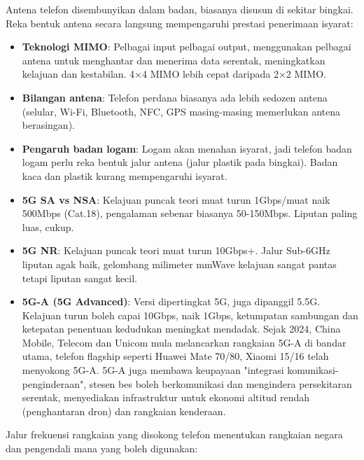 
Antena telefon disembunyikan dalam badan, biasanya disusun di sekitar bingkai. Reka bentuk antena secara langsung mempengaruhi prestasi penerimaan isyarat:

\begin{itemize}
  \item \textbf{Teknologi MIMO}: Pelbagai input pelbagai output, menggunakan pelbagai antena untuk menghantar dan menerima data serentak, meningkatkan kelajuan dan kestabilan. 4×4 MIMO lebih cepat daripada 2×2 MIMO.
  \item \textbf{Bilangan antena}: Telefon perdana biasanya ada lebih sedozen antena (selular, Wi-Fi, Bluetooth, NFC, GPS masing-masing memerlukan antena berasingan).
  \item \textbf{Pengaruh badan logam}: Logam akan menahan isyarat, jadi telefon badan logam perlu reka bentuk jalur antena (jalur plastik pada bingkai). Badan kaca dan plastik kurang mempengaruhi isyarat.
\end{itemize}


\begin{itemize}
  \item \textbf{5G SA vs NSA}: Kelajuan puncak teori muat turun 1Gbps/muat naik 500Mbps (Cat.18), pengalaman sebenar biasanya 50-150Mbps. Liputan paling luas, cukup.
  \item \textbf{5G NR}: Kelajuan puncak teori muat turun 10Gbps+. Jalur Sub-6GHz liputan agak baik, gelombang milimeter mmWave kelajuan sangat pantas tetapi liputan sangat kecil.
  \item \textbf{5G-A (5G Advanced)}: Versi dipertingkat 5G, juga dipanggil 5.5G. Kelajuan turun boleh capai 10Gbps, naik 1Gbps, ketumpatan sambungan dan ketepatan penentuan kedudukan meningkat mendadak. Sejak 2024, China Mobile, Telecom dan Unicom mula melancarkan rangkaian 5G-A di bandar utama, telefon flagship seperti Huawei Mate 70/80, Xiaomi 15/16 telah menyokong 5G-A. 5G-A juga membawa keupayaan "integrasi komunikasi-penginderaan", stesen bes boleh berkomunikasi dan mengindera persekitaran serentak, menyediakan infrastruktur untuk ekonomi altitud rendah (penghantaran dron) dan rangkaian kenderaan.
\end{itemize}


Jalur frekuensi rangkaian yang disokong telefon menentukan rangkaian negara dan pengendali mana yang boleh digunakan:

